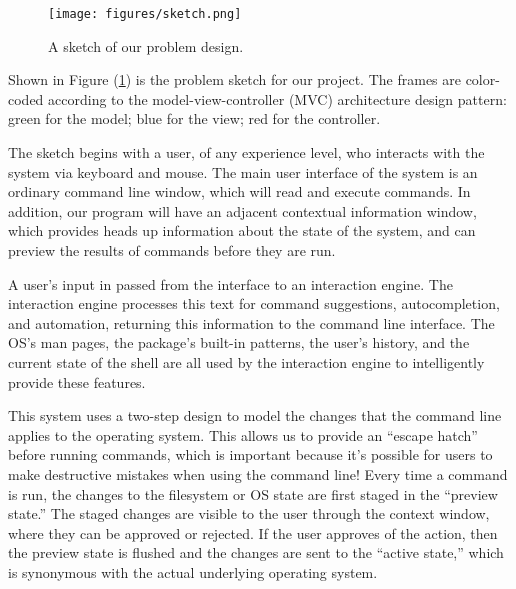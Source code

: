 \begin{figure}[h]
  \centering
  \texttt{[image: figures/sketch.png]}
  \caption{A sketch of our problem design.}
  \label{fig:sketch}
\end{figure}

Shown in Figure (\ref{fig:sketch}) is the problem sketch for our project. The
frames are color-coded according to the model-view-controller (MVC) architecture
design pattern: green for the model; blue for the view; red for the controller.

The sketch begins with a user, of any experience level, who interacts with the
system via keyboard and mouse. The main user interface of the system is an
ordinary command line window, which will read and execute commands. In addition,
our program will have an adjacent contextual information window, which provides
heads up information about the state of the system, and can preview the results
of commands before they are run.

A user's input in passed from the interface to an interaction engine. The
interaction engine processes this text for command suggestions, autocompletion,
and automation, returning this information to the command line interface. The
OS's man pages, the package's built-in patterns, the user's history, and the
current state of the shell are all used by the interaction engine to
intelligently provide these features.

This system uses a two-step design to model the changes that the command line
applies to the operating system. This allows us to provide an ``escape hatch''
before running commands, which is important because it's possible for users to
make destructive mistakes when using the command line! Every time a command is
run, the changes to the filesystem or OS state are first staged in the ``preview
state.'' The staged changes are visible to the user through the context window,
where they can be approved or rejected. If the user approves of the action, then
the preview state is flushed and the changes are sent to the ``active state,''
which is synonymous with the actual underlying operating system.